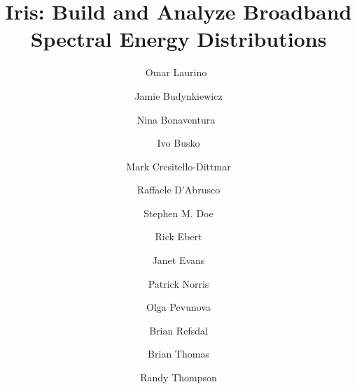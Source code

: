 \documentclass[preprint,12pt,3p]{elsarticle}
\begin{document}
\begin{frontmatter}



\title{Iris: Build and Analyze Broadband Spectral Energy Distributions}

\author[sao]{Omar Laurino~}
 
\author[sao]{Jamie Budynkiewicz}

\author[sao]{Nina Bonaventura~}

\author[stsci]{Ivo Busko}

\author[sao]{Mark Cresitello-Dittmar}

\author[sao]{Raffaele D'Abrusco}

\author[sao]{Stephen M. Doe}

\author[ipac]{Rick Ebert}

\author[sao]{Janet Evans}

\author[noao]{Patrick Norris}

\author[ipac]{Olga Pevunova}

\author[sao]{Brian Refsdal}

\author[noao]{Brian Thomas}

\author[stsci]{Randy Thompson}


\end{frontmatter}
\end{document}
